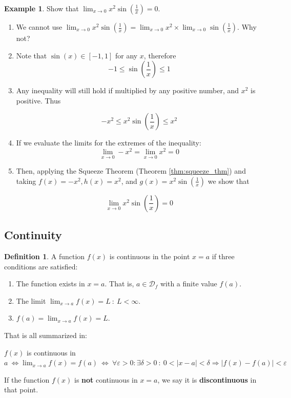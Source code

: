 \documentclass[a4paper,11pt]{article}
\theoremstyle{definition}
\newtheorem{definition}{Definition}
\newtheorem{example}{Example}
\theoremstyle{plain}
\begin{document}
\begin{example}
Show that $\lim_{x\rightarrow 0} x^2\sin\left(\frac{1}{x}\right) = 0$.

\begin{enumerate}
	\item We cannot use $\lim_{x\rightarrow 0} x^2\sin\left(\frac{1}{x}\right) = \lim_{x\rightarrow 0} x^2 \times \lim_{x\rightarrow 0}\sin\left(\frac{1}{x}\right)$. Why not?
	\item Note that $\sin(x)\in[-1,1]$ for any $x$, therefore
	\[
	-1 \leq \sin\left(\frac{1}{x}\right) \leq 1
	\]
	\item Any inequality will still hold if multiplied by any positive number, and $x^2$ is positive. Thus

	\[
	- x^2 \leq x^2 \sin\left(\frac{1}{x}\right) \leq x^2
	\]

	\item If we evaluate the limits for the extremes of the inequality:
	\[
	\lim_{x\rightarrow 0} -x^2 = \lim_{x\rightarrow 0} x^2 = 0
	\]

	\item Then, applying the Squeeze Theorem (Theorem \ref{thm:squeeze_thm}) and taking $f(x) = -x^2, h(x) = x^2$, and $g(x) = x^2 \sin\left(\frac{1}{x}\right)$ we show that

	\[
	\lim_{x\rightarrow 0} x^2\sin\left(\frac{1}{x}\right) = 0
	\]
\end{enumerate}
\end{example}


\subsection{Continuity}\label{continuity}

\begin{definition} 
A function \(f(x)\) is continuous in the point
\(x = a\) if three conditions are satisfied: 

\begin{enumerate}
    \item The function exists in \(x = a\). That is, \(a\in\mathcal{D}_{f}\) with a finite value \(f(a)\). 

    \item The limit \(\displaystyle\lim_{x\rightarrow a} f(x) = L \ : \ L < \infty\). 

    \item \(f(a) = \displaystyle\lim_{x\rightarrow a} f(x) = L\).
\end{enumerate}

That is all summarized in:

\(f(x)\) is continuous in \(a \ \iff \lim_{x\rightarrow a}f(x) = f(a) \ \iff \ \forall \varepsilon > 0 : \exists\delta> 0 \ : \ 0 < \lvert x-a \rvert < \delta \Rightarrow \lvert f(x)-f(a)\rvert < \varepsilon\)

If the function \(f(x)\) is \textbf{not} continuous in \(x = a\), we say it is \textbf{discontinuous} in that point.
\end{definition}
\end{document}
